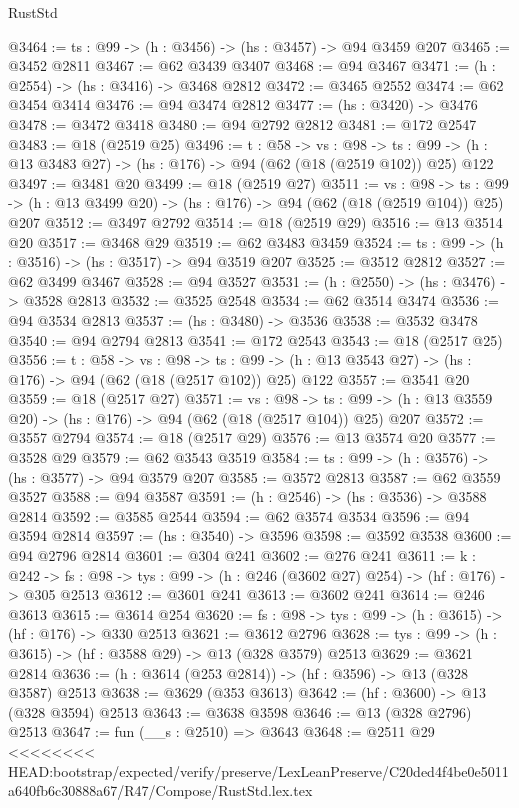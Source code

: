 \begin{lexlean}{RustStd}
\begin{coremodule}
{\begin{coremodule}
{{{{{{@3464 := {ts : @99} -> (h : @3456) -> (hs : @3457) -> @94 @3459 @207
@3465 := @3452 @2811
@3467 := @62 @3439 @3407
@3468 := @94 @3467
@3471 := (h : @2554) -> (hs : @3416) -> @3468 @2812
@3472 := @3465 @2552
@3474 := @62 @3454 @3414
@3476 := @94 @3474 @2812
@3477 := (hs : @3420) -> @3476
@3478 := @3472 @3418
@3480 := @94 @2792 @2812
@3481 := @172 @2547
@3483 := @18 (@2519 @25)
@3496 := {t : @58} ->
  {vs : @98} ->
  {ts : @99} -> (h : @13 @3483 @27) -> (hs : @176) -> @94 (@62 (@18 (@2519 @102)) @25) @122
@3497 := @3481 @20
@3499 := @18 (@2519 @27)
@3511 := {vs : @98} ->
  {ts : @99} -> (h : @13 @3499 @20) -> (hs : @176) -> @94 (@62 (@18 (@2519 @104)) @25) @207
@3512 := @3497 @2792
@3514 := @18 (@2519 @29)
@3516 := @13 @3514 @20
@3517 := @3468 @29
@3519 := @62 @3483 @3459
@3524 := {ts : @99} -> (h : @3516) -> (hs : @3517) -> @94 @3519 @207
@3525 := @3512 @2812
@3527 := @62 @3499 @3467
@3528 := @94 @3527
@3531 := (h : @2550) -> (hs : @3476) -> @3528 @2813
@3532 := @3525 @2548
@3534 := @62 @3514 @3474
@3536 := @94 @3534 @2813
@3537 := (hs : @3480) -> @3536
@3538 := @3532 @3478
@3540 := @94 @2794 @2813
@3541 := @172 @2543
@3543 := @18 (@2517 @25)
@3556 := {t : @58} ->
  {vs : @98} ->
  {ts : @99} -> (h : @13 @3543 @27) -> (hs : @176) -> @94 (@62 (@18 (@2517 @102)) @25) @122
@3557 := @3541 @20
@3559 := @18 (@2517 @27)
@3571 := {vs : @98} ->
  {ts : @99} -> (h : @13 @3559 @20) -> (hs : @176) -> @94 (@62 (@18 (@2517 @104)) @25) @207
@3572 := @3557 @2794
@3574 := @18 (@2517 @29)
@3576 := @13 @3574 @20
@3577 := @3528 @29
@3579 := @62 @3543 @3519
@3584 := {ts : @99} -> (h : @3576) -> (hs : @3577) -> @94 @3579 @207
@3585 := @3572 @2813
@3587 := @62 @3559 @3527
@3588 := @94 @3587
@3591 := (h : @2546) -> (hs : @3536) -> @3588 @2814
@3592 := @3585 @2544
@3594 := @62 @3574 @3534
@3596 := @94 @3594 @2814
@3597 := (hs : @3540) -> @3596
@3598 := @3592 @3538
@3600 := @94 @2796 @2814
@3601 := @304 @241
@3602 := @276 @241
@3611 := {k : @242} ->
  {fs : @98} -> {tys : @99} -> (h : @246 (@3602 @27) @254) -> (hf : @176) -> @305 @2513
@3612 := @3601 @241
@3613 := @3602 @241
@3614 := @246 @3613
@3615 := @3614 @254
@3620 := {fs : @98} -> {tys : @99} -> (h : @3615) -> (hf : @176) -> @330 @2513
@3621 := @3612 @2796
@3628 := {tys : @99} -> (h : @3615) -> (hf : @3588 @29) -> @13 (@328 @3579) @2513
@3629 := @3621 @2814
@3636 := (h : @3614 (@253 @2814)) -> (hf : @3596) -> @13 (@328 @3587) @2513
@3638 := @3629 (@353 @3613)
@3642 := (hf : @3600) -> @13 (@328 @3594) @2513
@3643 := @3638 @3598
@3646 := @13 (@328 @2796) @2513
@3647 := fun (__s : @2510) => @3643
@3648 := @2511 @29
<<<<<<<< HEAD:bootstrap/expected/verify/preserve/LexLeanPreserve/C20ded4f4be0e5011a640fb6c30888a67/R47/Compose/RustStd.lex.tex
}}}}}}
\end{coremodule}}
\end{coremodule}
\end{lexlean}

